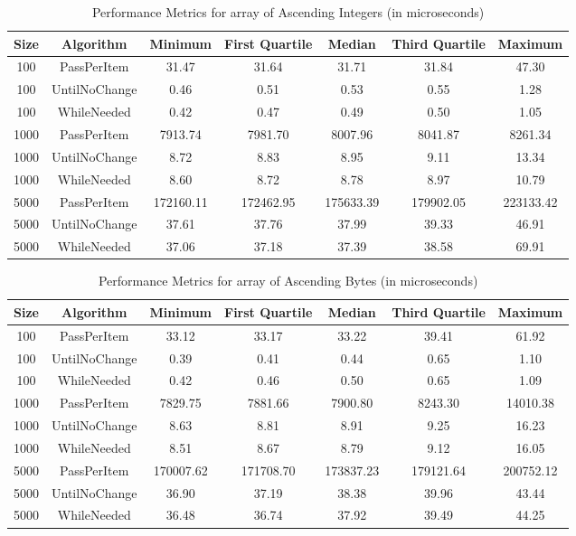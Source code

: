 \documentclass{article}
\begin{document}
\begin{table}[htbp]
    \centering
    \begin{tabular}{ccccccc}
        \toprule
        \textbf{Size} & \textbf{Algorithm} & \textbf{Minimum} & \textbf{First Quartile} & \textbf{Median} & \textbf{Third Quartile} & \textbf{Maximum} \\
        \midrule
        100 & PassPerItem & 31.47 & 31.64 & 31.71 & 31.84 & 47.30 \\
        100 & UntilNoChange & 0.46 & 0.51 & 0.53 & 0.55 & 1.28 \\
        100 & WhileNeeded & 0.42 & 0.47 & 0.49 & 0.50 & 1.05 \\
        1000 & PassPerItem & 7913.74 & 7981.70 & 8007.96 & 8041.87 & 8261.34 \\
        1000 & UntilNoChange & 8.72 & 8.83 & 8.95 & 9.11 & 13.34 \\
        1000 & WhileNeeded & 8.60 & 8.72 & 8.78 & 8.97 & 10.79 \\
        5000 & PassPerItem & 172160.11 & 172462.95 & 175633.39 & 179902.05 & 223133.42 \\
        5000 & UntilNoChange & 37.61 & 37.76 & 37.99 & 39.33 & 46.91 \\
        5000 & WhileNeeded & 37.06 & 37.18 & 37.39 & 38.58 & 69.91 \\
        \bottomrule
    \end{tabular}
    \caption{Performance Metrics for array of Ascending Integers (in microseconds)}
    \label{tab:performance_5}
\end{table}

\begin{table}[htbp]
    \centering
    \begin{tabular}{ccccccc}
        \toprule
        \textbf{Size} & \textbf{Algorithm} & \textbf{Minimum} & \textbf{First Quartile} & \textbf{Median} & \textbf{Third Quartile} & \textbf{Maximum} \\
        \midrule
        100 & PassPerItem & 33.12 & 33.17 & 33.22 & 39.41 & 61.92 \\
        100 & UntilNoChange & 0.39 & 0.41 & 0.44 & 0.65 & 1.10 \\
        100 & WhileNeeded & 0.42 & 0.46 & 0.50 & 0.65 & 1.09 \\
        1000 & PassPerItem & 7829.75 & 7881.66 & 7900.80 & 8243.30 & 14010.38 \\
        1000 & UntilNoChange & 8.63 & 8.81 & 8.91 & 9.25 & 16.23 \\
        1000 & WhileNeeded & 8.51 & 8.67 & 8.79 & 9.12 & 16.05 \\
        5000 & PassPerItem & 170007.62 & 171708.70 & 173837.23 & 179121.64 & 200752.12 \\
        5000 & UntilNoChange & 36.90 & 37.19 & 38.38 & 39.96 & 43.44 \\
        5000 & WhileNeeded & 36.48 & 36.74 & 37.92 & 39.49 & 44.25 \\
        \bottomrule
    \end{tabular}
    \caption{Performance Metrics for array of Ascending Bytes (in microseconds)}
    \label{tab:performance_6}
\end{table}
\end{document}
